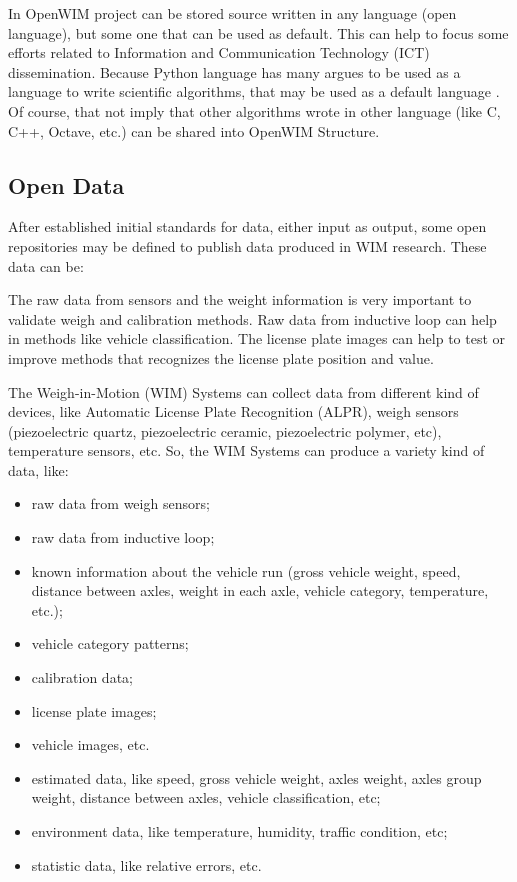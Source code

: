 \documentclass[a4paper]{article}
\begin{document}
{In OpenWIM project can be stored source written in any language (open language), but some one that can be used as default. This can help to focus some efforts related to Information and Communication Technology (ICT) dissemination. Because Python language has many argues to be used as a language to write scientific algorithms, that may be used as a default language \cite{ayer2014scientists}. Of course, that not imply that other algorithms wrote in other language (like C, C++, Octave, etc.) can be shared into OpenWIM Structure.


\subsection{Open Data}\label{open-Data}

After established initial standards for data, either input as output, some open repositories may be defined to publish data produced in WIM research. These data can be:

The raw data from sensors and the weight information is very important to validate weigh and calibration methods. Raw data from inductive loop can help in methods like vehicle classification. The license plate images can help to test or improve methods that recognizes the license plate position and value.

The Weigh-in-Motion (WIM) Systems can collect data from different kind of devices, like Automatic License Plate Recognition (ALPR), weigh sensors (piezoelectric quartz, piezoelectric ceramic, piezoelectric polymer, etc), temperature sensors, etc. So, the WIM Systems can produce a variety kind of data, like:

\begin{itemize}
\item raw data from weigh sensors;
\item raw data from inductive loop;
\item known information about the vehicle run (gross vehicle weight, speed, distance between axles, weight in each axle, vehicle category, temperature, etc.);
\item vehicle category patterns;
\item calibration data;
\item license plate images;
\item vehicle images, etc.
\item estimated data, like speed, gross vehicle weight, axles weight, axles group weight, distance between axles, vehicle classification, etc;
\item environment data, like temperature, humidity, traffic condition, etc;
\item statistic data, like relative errors, etc.
\end{itemize}

}
\end{document}
